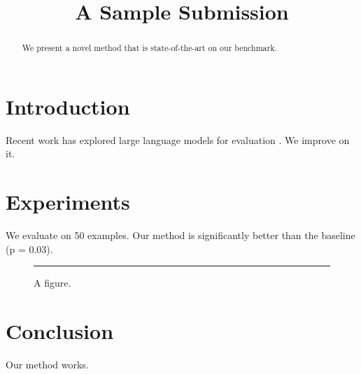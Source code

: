 \documentclass{article}
\title{A Sample Submission}
\begin{document}
\maketitle
\begin{abstract}
We present a novel method that is state-of-the-art on our benchmark.
\end{abstract}

\section{Introduction}
Recent work has explored large language models for evaluation \cite{smith2024}.
We improve on it.

\section{Experiments}
We evaluate on 50 examples. Our method is significantly better than the
baseline (p = 0.03).

\begin{figure}
\centering
\rule{4cm}{3cm}
\caption{A figure.}
\label{fig:unused}
\end{figure}

\section{Conclusion}
Our method works.
\end{document}
